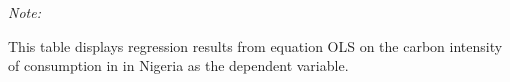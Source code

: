 \begin{table}[htbp!]
\begin{adjustbox}{width = 1\textwidth, max height = 0.95\textheight, center}
\begin{threeparttable}[b]
         \begin{tablenotes}\item \medskip \textit{Note:}
            \item This table displays regression results from equation OLS on the carbon intensity of consumption in  in Nigeria as the dependent variable. 
         \end{tablenotes}
      \end{threeparttable}
   \end{adjustbox}
\end{table}


